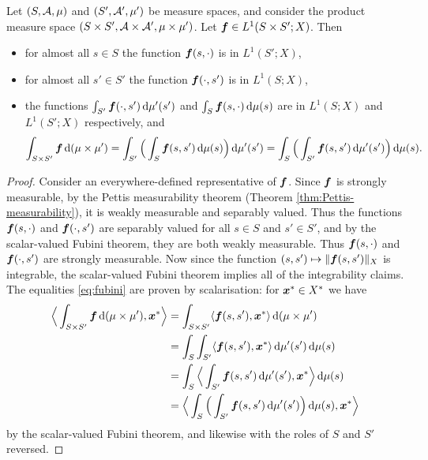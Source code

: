 \begin{prop}[Fubini]
  Let $(S,\mathcal{A},\mu)$ and $(S',\mathcal{A}',\mu')$ be measure spaces, and consider the product measure space $(S \times S', \mathcal{A} \times \mathcal{A}', \mu \times \mu')$.
  Let $\bm{f} \in L^1(S \times S'; X)$.
  Then
  \begin{itemize}
  \item for almost all $s \in S$ the function $\bm{f}(s,\cdot)$ is in $L^1(S';X)$,
  \item for almost all $s' \in S'$ the function $\bm{f}(\cdot,s')$ is in $L^1(S;X)$,
  \item the functions $\int_{S'} \bm{f}(\cdot,s') \, \mathrm{d}\mu'(s')$ and $\int_{S} \bm{f}(s,\cdot) \, \mathrm{d}\mu(s)$ are in $L^1(S;X)$ and $L^1(S';X)$ respectively, and
    \begin{equation}\label{eq:fubini}
      \int_{S \times S'} \bm{f} \, \mathrm{d}(\mu \times \mu') = \int_{S'} \Big(  \int_S \bm{f}(s,s') \, \mathrm{d}\mu(s) \Big) \, \mathrm{d}\mu'(s') = \int_S \Big(\int_{S'} \bm{f}(s,s') \, \mathrm{d}\mu'(s') \Big) \, \mathrm{d}\mu(s).
    \end{equation}
  \end{itemize}
\end{prop}

\begin{proof}
  Consider an everywhere-defined representative of $\bm{f}$.
  Since $\bm{f}$ is strongly measurable, by the Pettis measurability theorem (Theorem \ref{thm:Pettis-measurability}), it is weakly measurable and separably valued.
  Thus the functions $\bm{f}(s,\cdot)$ and $\bm{f}(\cdot,s')$ are separably valued for all $s \in S$ and $s' \in S'$, and by the scalar-valued Fubini theorem, they are both weakly measurable.
  Thus $\bm{f}(s,\cdot)$ and $\bm{f}(\cdot,s')$ are strongly measurable.
  Now since the function $(s,s') \mapsto \|\bm{f}(s,s')\|_X$ is integrable, the scalar-valued Fubini theorem implies all of the integrability claims.
  The equalities \eqref{eq:fubini} are proven by scalarisation: for $\bm{x}^* \in X^*$ we have
  \begin{equation*}
    \begin{aligned}
      \Big\langle \int_{S \times S'} \bm{f} \, \mathrm{d}(\mu \times \mu') , \bm{x}^* \Big\rangle
      &= \int_{S \times S'} \langle \bm{f}(s,s'), \bm{x}^* \rangle \, \mathrm{d}(\mu \times \mu') \\
      &= \int_{S} \int_{S'} \langle \bm{f}(s,s'), \bm{x}^* \rangle \, \mathrm{d}\mu'(s') \, \mathrm{d}\mu(s) \\
      &= \int_{S} \Big\langle \int_{S'} \bm{f}(s,s') \, \mathrm{d}\mu'(s') , \bm{x}^* \Big\rangle \, \mathrm{d}\mu(s) \\
      &= \Big\langle \int_S \Big(\int_{S'} \bm{f}(s,s') \, \mathrm{d}\mu'(s') \Big)\, \mathrm{d}\mu(s) , \bm{x}^* \Big\rangle
  \end{aligned}
  \end{equation*}
  by the scalar-valued Fubini theorem, and likewise with the roles of $S$ and $S'$ reversed.
\end{proof}

